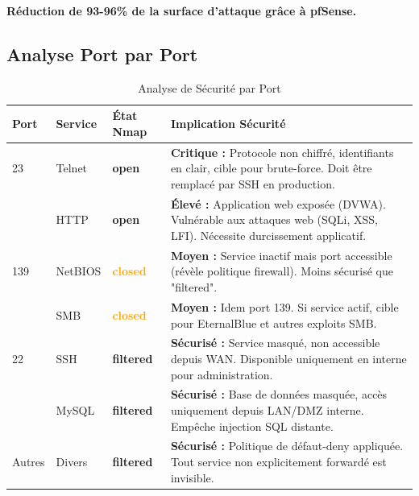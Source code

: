 \documentclass[12pt,a4paper,openany]{report}
\newcommand{\tableheadcolor}{\rowcolor{tableheadbg}}
\begin{document}
	\textcolor{green}{\checkmark} \textbf{Réduction de 93-96\% de la surface d'attaque grâce à pfSense.}
	
	\subsection{Analyse Port par Port}
	
	\begin{table}[H]
		\centering
		\small
		\renewcommand{\arraystretch}{1.6}
		\setlength{\arrayrulewidth}{0.5pt}
		\begin{tabular}{>{\centering\arraybackslash}p{1.5cm} p{2.5cm} p{2.3cm} p{8cm}}
			\arrayrulecolor{tableborder}
			\hline
			\tableheadcolor
			\textcolor{tableheadfg}{\textbf{Port}} &
			\textcolor{tableheadfg}{\textbf{Service}} &
			\textcolor{tableheadfg}{\textbf{État Nmap}} &
			\textcolor{tableheadfg}{\textbf{Implication Sécurité}} \\
			\hline
			\rowcolor{tablerowalt}
			23 & Telnet & \textcolor{green!50!black}{\textbf{open}} &
			\textbf{Critique :} Protocole non chiffré, identifiants en clair, cible pour brute-force. Doit être remplacé par SSH en production. \\
			
			80 & HTTP & \textcolor{green!50!black}{\textbf{open}} &
			\textbf{Élevé :} Application web exposée (DVWA). Vulnérable aux attaques web (SQLi, XSS, LFI). Nécessite durcissement applicatif. \\
			
			\rowcolor{tablerowalt}
			139 & NetBIOS & \textcolor{orange}{\textbf{closed}} &
			\textbf{Moyen :} Service inactif mais port accessible (révèle politique firewall). Moins sécurisé que "filtered". \\
			
			445 & SMB & \textcolor{orange}{\textbf{closed}} &
			\textbf{Moyen :} Idem port 139. Si service actif, cible pour EternalBlue et autres exploits SMB. \\
			
			\rowcolor{tablerowalt}
			22 & SSH & \textcolor{accent}{\textbf{filtered}} &
			\textbf{Sécurisé :} Service masqué, non accessible depuis WAN. Disponible uniquement en interne pour administration. \\
			
			3306 & MySQL & \textcolor{accent}{\textbf{filtered}} &
			\textbf{Sécurisé :} Base de données masquée, accès uniquement depuis LAN/DMZ interne. Empêche injection SQL distante. \\
			
			\rowcolor{tablerowalt}
			Autres & Divers & \textcolor{accent}{\textbf{filtered}} &
			\textbf{Sécurisé :} Politique de défaut-deny appliquée. Tout service non explicitement forwardé est invisible. \\
			\hline
		\end{tabular}
		\caption{Analyse de Sécurité par Port}
		\label{tab:port-security-analysis}
	\end{table}
	
\end{document}
